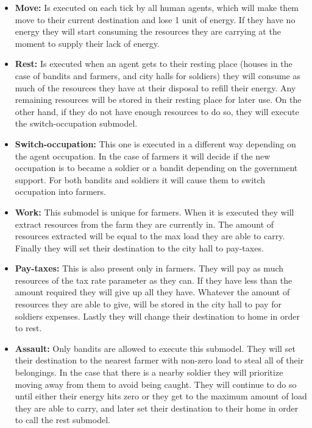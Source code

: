 \documentclass{wscpaperproc}
\begin{document}
\begin{itemize}
    \item \textbf{Move:} Is executed on each tick by all human agents, which
    will make them move to their current destination and lose 1 unit of energy.
    If they have no energy they will start consuming the resources they are
    carrying at the moment to supply their lack of energy.

    \item \textbf{Rest:} Is executed when an agent gets to
    their resting place (houses in the case of bandits and farmers, and city
    halls for soldiers) they will consume as much of the resources they
    have at their disposal to refill their energy. Any remaining resources will
    be stored in their resting place for later use. On the other hand, if they
    do not have enough resources to do so, they will execute the
    switch-occupation submodel.

    \item \textbf{Switch-occupation:} This one is executed in a different way
    depending on the agent occupation. In the case of farmers it will decide if
    the new occupation is to became a soldier or a bandit depending on the
    government support. For both bandits and soldiers it will cause them to
    switch occupation into farmers.

    \item \textbf{Work:} This submodel is unique for farmers. When it is
    executed they will extract resources from the farm they are currently in.
    The amount of resources extracted will be equal to the max load they are
    able to carry. Finally they will set their destination to the city hall to
    pay-taxes.

    \item \textbf{Pay-taxes:} This is also present only in farmers.
    They will pay as much resources of the tax rate parameter as they can. If
    they have less than the amount required they will give up all they
    have. Whatever the amount of resources they are able to give, will be stored
    in the city hall to pay for soldiers expenses. Lastly they will change
    their destination to home in order to rest.

    \item \textbf{Assault:} Only bandits are allowed to execute this submodel.
    They will set their destination to the nearest farmer with non-zero load to
    steal all of their belongings. In the case that there is a nearby soldier
    they will prioritize moving away from them to avoid being caught. They
    will continue to do so until either their energy hits zero or they get to the
    maximum amount of load they are able to carry, and later set their destination
    to their home in order to call the rest submodel.


\end{itemize}
\end{document}
